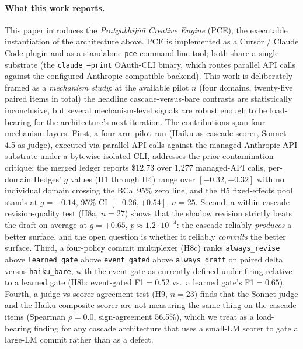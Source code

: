 \paragraph{What this work reports.} This paper introduces the \emph{Pratyabhij\~n\=a Creative Engine} (PCE), the executable instantiation of the architecture above. PCE is implemented as a Cursor / Claude Code plugin and as a standalone \texttt{pce} command-line tool; both share a single substrate (the \texttt{claude --print} OAuth-CLI binary, which routes parallel API calls against the configured Anthropic-compatible backend). This work is deliberately framed as a \emph{mechanism study}: at the available pilot $n$ (four domains, twenty-five paired items in total) the headline cascade-versus-bare contrasts are statistically inconclusive, but several mechanism-level signals are robust enough to be load-bearing for the architecture's next iteration. The contributions span four mechanism layers. First, a four-arm pilot run (Haiku as cascade scorer, Sonnet 4.5 as judge), executed via parallel API calls against the managed Anthropic-API substrate under a bytewise-isolated CLI, addresses the prior contamination critique; the merged ledger reports \$12.73 over 1{,}277 managed-API calls, per-domain Hedges' $g$ values (H1 through H4) range over $[-0.32,+0.32]$ with no individual domain crossing the BCa~95\% zero line, and the H5 fixed-effects pool stands at $g=+0.14$, 95\% CI $[-0.26,+0.54]$, $n=25$. Second, a within-cascade revision-quality test (H8a, $n=27$) shows that the shadow revision strictly beats the draft on average at $g=+0.65$, $p\approx 1.2\!\cdot\! 10^{-4}$: the cascade reliably \emph{produces} a better surface, and the open question is whether it reliably \emph{commits} the better surface. Third, a four-policy commit multiplexer (H8c) ranks \texttt{always\_revise} above \texttt{learned\_gate} above \texttt{event\_gated} above \texttt{always\_draft} on paired delta versus \texttt{haiku\_bare}, with the  event gate as currently defined under-firing relative to a learned gate (H8b: event-gated F1${}=0.52$ vs.\ a learned gate's F1${}=0.65$). Fourth, a judge-vs-scorer agreement test (H9, $n=23$) finds that the Sonnet judge and the Haiku composite scorer are not measuring the same thing on the cascade items (Spearman $\rho=0.0$, sign-agreement 56.5\%), which we treat as a load-bearing finding for any cascade architecture that uses a small-LM scorer to gate a large-LM commit rather than as a defect.

